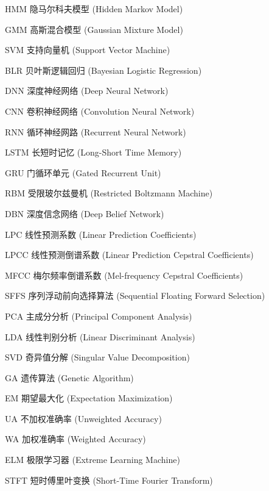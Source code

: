 \begin{denotation}[3cm]
\item [HMM] 隐马尔科夫模型 (Hidden Markov Model)
\item [GMM] 高斯混合模型 (Gaussian Mixture Model)
\item [SVM] 支持向量机 (Support Vector Machine)
\item [BLR] 贝叶斯逻辑回归 (Bayesian Logistic Regression)
\item [DNN] 深度神经网络 (Deep Neural Network)
\item [CNN] 卷积神经网络 (Convolution Neural Network)
\item [RNN] 循环神经网路 (Recurrent Neural Network)
\item [LSTM] 长短时记忆 (Long-Short Time Memory)
\item [GRU] 门循环单元 (Gated Recurrent Unit)
\item [RBM] 受限玻尔兹曼机 (Restricted Boltzmann Machine)
\item [DBN] 深度信念网络 (Deep Belief Network)
\item [LPC] 线性预测系数 (Linear Prediction Coefficients)
\item [LPCC] 线性预测倒谱系数 (Linear Prediction Cepstral Coefficients)
\item [MFCC] 梅尔频率倒谱系数 (Mel-frequency Cepstral Coefficients)
\item [SFFS] 序列浮动前向选择算法 (Sequential Floating Forward Selection)
\item [PCA] 主成分分析 (Principal Component Analysis)
\item [LDA] 线性判别分析 (Linear Discriminant Analysis)
\item [SVD] 奇异值分解 (Singular Value Decomposition)
\item [GA] 遗传算法 (Genetic Algorithm)
\item [EM] 期望最大化 (Expectation Maximization)
\item [UA] 不加权准确率 (Unweighted Accuracy)
\item [WA] 加权准确率 (Weighted Accuracy)
\item [ELM] 极限学习器 (Extreme Learning Machine)
\item [STFT] 短时傅里叶变换 (Short-Time Fourier Transform)
\end{denotation}

